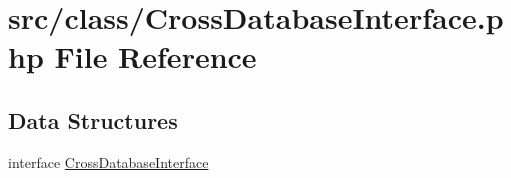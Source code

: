 \hypertarget{_cross_database_interface_8php}{}\section{src/class/\+Cross\+Database\+Interface.php File Reference}
\label{_cross_database_interface_8php}
\subsection*{Data Structures}
\begin{DoxyCompactItemize}
\item 
interface \hyperlink{interface_cross_database_interface}{Cross\+Database\+Interface}
\end{DoxyCompactItemize}
